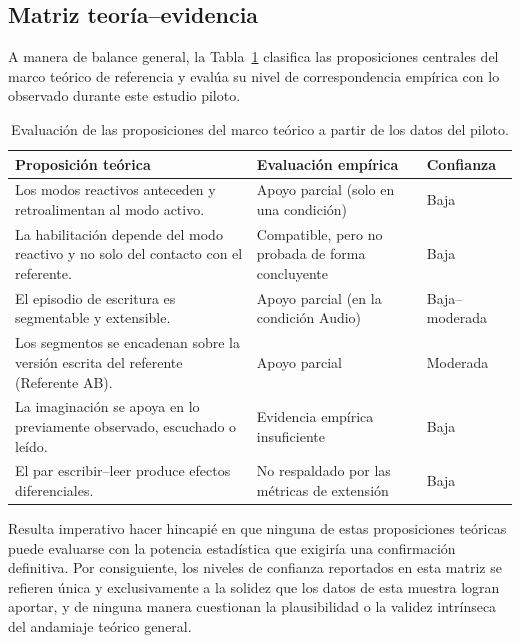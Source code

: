 \documentclass[12pt]{article}
\begin{document}
	\subsection{Matriz teoría--evidencia}
	
	A manera de balance general, la Tabla~\ref{tab:matriz_piloto} clasifica las proposiciones centrales del marco teórico de referencia y evalúa su nivel de correspondencia empírica con lo observado durante este estudio piloto. 
	
	\begin{table}[H]
		\centering
		\caption{Evaluación de las proposiciones del marco teórico a partir de los datos del piloto.}
		\label{tab:matriz_piloto}
		\small
		\begin{tabular}{p{} p{} p{}}
			\toprule
			\textbf{Proposición teórica} & \textbf{Evaluación empírica} & \textbf{Confianza} \\
			\midrule
			Los modos reactivos anteceden y retroalimentan al modo activo. &
			Apoyo parcial (solo en una condición) & Baja \\[2pt]
			La habilitación depende del modo reactivo y no solo del contacto con el referente. &
			Compatible, pero no probada de forma concluyente & Baja \\[2pt]
			El episodio de escritura es segmentable y extensible. &
			Apoyo parcial (en la condición Audio) & Baja--moderada \\[2pt]
			Los segmentos se encadenan sobre la versión escrita del referente (Referente AB). &
			Apoyo parcial & Moderada \\[2pt]
			La imaginación se apoya en lo previamente observado, escuchado o leído. &
			Evidencia empírica insuficiente & Baja \\[2pt]
			El par escribir--leer produce efectos diferenciales. &
			No respaldado por las métricas de extensión & Baja \\
			\bottomrule
		\end{tabular}
	\end{table}
	
	Resulta imperativo hacer hincapié en que ninguna de estas proposiciones teóricas puede evaluarse con la potencia estadística que exigiría una confirmación definitiva. Por consiguiente, los niveles de confianza reportados en esta matriz se refieren única y exclusivamente a la solidez que los datos de esta muestra logran aportar, y de ninguna manera cuestionan la plausibilidad o la validez intrínseca del andamiaje teórico general.
	
\end{document}
